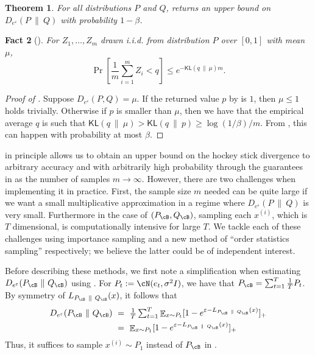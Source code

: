 \documentclass[twoside]{article}
\newtheorem{theorem}{Theorem}[section]
\newtheorem{fact}[theorem]{Fact}
\theoremstyle{definition}
\DeclareMathOperator*{\E}{\mathbb{E}}
\newcommand{\eps}{\varepsilon}
\newcommand{\sq}[1]{\left [ #1 \right ]}
\newcommand{\Deps}{D_{e^{\eps}}}
\newcommand{\KL}{\mathsf{KL}}
\newcommand{\PB}{P_{\cB}}
\newcommand{\QB}{Q_{\cB}}
\begin{document}
\begin{theorem}\label{thm:high-prob-delta}
For all distributions $P$ and $Q$,  returns an upper bound on $\Deps(P ~\|~ Q)$ with probability $1 - \beta$.
\end{theorem}

\begin{fact}[\cite{hoeffding63probability}]\label{fact:hoeffding}
For $Z_1, \ldots, Z_m$ drawn i.i.d. from distribution $P$ over $[0, 1]$ with mean $\mu$, %
\[\textstyle
\Pr\sq{\frac1m \sum_{i=1}^m Z_i < q} \le e^{-\KL(q ~\|~ \mu) m}.
\]
\end{fact}
\begin{proof}[Proof of ]
Suppose $\Deps(P, Q) = \mu$. If the returned value $p$ by  is $1$, then $\mu \le 1$ holds trivially. Otherwise if $p$ is smaller than $\mu$, then we have that the empirical average $q$ is such that $\KL(q ~\|~ \mu) > \KL(q ~\|~ p) \ge \log(1/\beta) / m$. From , this can happen with probability at most $\beta$.
\end{proof}
 in principle allows us to obtain an upper bound on the hockey stick divergence to arbitrary accuracy and with arbitrarily high probability through the guarantees in  as the number of samples $m\to\infty$.
However, there are two challenges when implementing it in practice. First, the sample size $m$ needed can be quite large if we want a small multiplicative approximation in a regime where $\Deps(P ~\|~ Q)$ is very small. Furthermore in the case of $(\PB, \QB)$, sampling each $x^{(i)}$, which is $T$ dimensional, is computationally intensive for large $T$. We tackle each of these challenges using importance sampling and a new method of ``order statistics sampling'' respectively; we believe the latter could be of independent interest.

Before describing these methods, we first note a simplification when estimating $\Deps(\PB ~\|~ \QB)$ using . For $P_t := \cN(e_t, \sigma^2 I)$, we have that $\PB = \sum_{t=1}^T \frac1T P_t$. By symmetry of $L_{\PB ~\|~ \QB}(x)$, it follows that
\begin{align*}
\Deps(\PB ~\|~ \QB)
&\textstyle~=~ \frac1T \sum_{t=1}^T \E_{x \sim P_t} [1 - e^{\eps - L_{\PB ~\|~ \QB}(x)}]_+\\
&\textstyle~=~ \E_{x \sim P_1} [1 - e^{\eps - L_{\PB ~\|~ \QB}(x)}]_+
\end{align*}
Thus, it suffices to sample $x^{(i)} \sim P_1$ instead of $\PB$ in .
\end{document}
